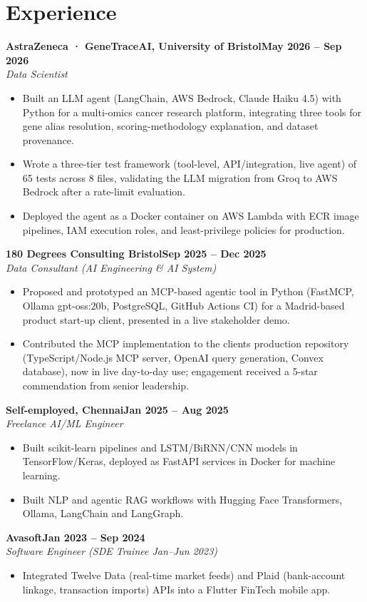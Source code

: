 \documentclass[a4paper,10pt]{article}
\newcommand{\entry}[4]{\noindent\textbf{#1}\hfill\textbf{#2}\\ \textit{#3}\hfill\textit{#4}\par}
\begin{document}
\section{Experience}
\entry{AstraZeneca · GeneTraceAI, University of Bristol}{May 2026 – Sep 2026}{Data Scientist}{}
\begin{itemize}
  \item Built an LLM agent (LangChain, AWS Bedrock, Claude Haiku 4.5) with Python for a multi-omics cancer research platform, integrating three tools for gene alias resolution, scoring-methodology explanation, and dataset provenance.
  \item Wrote a three-tier test framework (tool-level, API/integration, live agent) of 65 tests across 8 files, validating the LLM migration from Groq to AWS Bedrock after a rate-limit evaluation.
  \item Deployed the agent as a Docker container on AWS Lambda with ECR image pipelines, IAM execution roles, and least-privilege policies for production.
\end{itemize}
\vspace{3pt}
\entry{180 Degrees Consulting Bristol}{Sep 2025 – Dec 2025}{Data Consultant (AI Engineering \& AI System)}{}
\begin{itemize}
  \item Proposed and prototyped an MCP-based agentic tool in Python (FastMCP, Ollama gpt-oss:20b, PostgreSQL, GitHub Actions CI) for a Madrid-based product start-up client, presented in a live stakeholder demo.
  \item Contributed the MCP implementation to the client\textquotesingle{}s production repository (TypeScript/Node.js MCP server, OpenAI query generation, Convex database), now in live day-to-day use; engagement received a 5-star commendation from senior leadership.
\end{itemize}
\vspace{3pt}
\entry{Self-employed, Chennai}{Jan 2025 – Aug 2025}{Freelance AI/ML Engineer}{}
\begin{itemize}
  \item Built scikit-learn pipelines and LSTM/BiRNN/CNN models in TensorFlow/Keras, deployed as FastAPI services in Docker for machine learning.
  \item Built NLP and agentic RAG workflows with Hugging Face Transformers, Ollama, LangChain and LangGraph.
\end{itemize}
\vspace{3pt}
\entry{Avasoft}{Jan 2023 – Sep 2024}{Software Engineer (SDE Trainee Jan–Jun 2023)}{}
\begin{itemize}
  \item Integrated Twelve Data (real-time market feeds) and Plaid (bank-account linkage, transaction imports) APIs into a Flutter FinTech mobile app.
\end{itemize}
\end{document}
